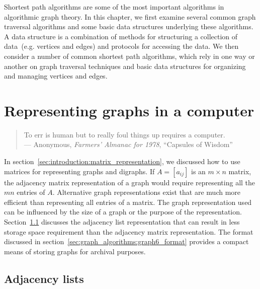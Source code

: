 Shortest path algorithms are some of the most
important algorithms in algorithmic graph theory. In this chapter, we
first examine several common graph traversal algorithms and some basic
data structures underlying these algorithms. A
data structure is a combination of methods for structuring a
collection of data~(e.g. vertices and edges) and protocols for
accessing the data. We then consider a number of common shortest path
algorithms, which rely in one way or another on graph traversal
techniques and basic data structures for organizing and managing
vertices and edges.



\section{Representing graphs in a computer}

\begin{quote}
\footnotesize
To err is human but to really foul things up requires a computer. \\
\noindent
--- Anonymous, \emph{Farmers' Almanac for 1978}, ``Capsules of Wisdom''
\end{quote}

\noindent
In section~\ref{sec:introduction:matrix_representation}, we discussed
how to use matrices for representing graphs and digraphs. If
$A = [a_{ij}]$ is an $m \times n$ matrix, the adjacency matrix
representation of a graph would require representing all the $mn$
entries of $A$. Alternative graph representations exist that are much
more efficient than representing all entries of a matrix. The graph
representation used can be influenced by the size of a graph or the
purpose of the representation.
Section~\ref{sec:graph_algorithms:adjacency_lists} discusses the
adjacency list representation that can result in
less storage space requirement than the adjacency
matrix representation. The
\graphsix\index{\graphsix} format discussed in
section~\ref{sec:graph_algorithms:graph6_format} provides a compact
means of storing graphs for archival purposes.



\subsection{Adjacency lists}
\label{sec:graph_algorithms:adjacency_lists}

